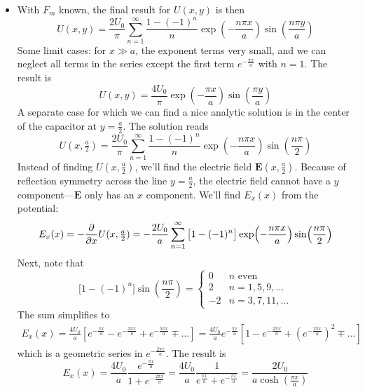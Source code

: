 \documentclass[11pt, a4paper]{article}
\renewcommand{\vec}[1]{\bm{#1}} %
\newcommand{\E}{\vec{E}} %
\begin{document}
\begin{itemize}
	\item With $ F_{m} $ known, the final result for $ U(x, y) $ is then
	\begin{equation*}
		U(x, y) = \frac{2U_{0}}{\pi} \sum_{n = 1}^{\infty}\frac{1 - (-1)^{n}}{n}\exp(-\frac{n\pi x}{a}) \sin(\frac{n\pi y}{a})
	\end{equation*}
	Some limit cases: for $ x \gg a $, the exponent terms very small, and we can neglect all terms in the series except the first term $ e^{-\frac{\pi x}{a}} $ with $ n = 1 $. The result is
	\begin{equation*}
		U(x, y) = \frac{4U_{0}}{\pi}\exp(-\frac{\pi x}{a}) \sin (\frac{\pi y}{a})
	\end{equation*}
	A separate case for which we can find a nice analytic solution is in the center of the capacitor at $ y = \frac{a}{2} $. The solution reads
	\begin{equation*}
		U(x, \tfrac{a}{2}) = \frac{2U_{0}}{\pi} \sum_{n = 1}^{\infty}\frac{1 - (-1)^{n}}{n}\exp(-\frac{n\pi x}{a}) \sin(\frac{n\pi}{2})
	\end{equation*}
	Instead of finding $ U(x, \tfrac{a}{2}) $, we'll find the electric field $ \E(x, \tfrac{a}{2}) $. Because of reflection symmetry across the line $ y = \frac{a}{2} $, the electric field cannot have a $ y $ component---$ \E $ only has an $ x $ component. We'll find $ E_{x}(x) $ from the potential:
	\begin{equation*}
		E_{x}(x) = -\pdv{}{x}U(x, \tfrac{a}{2}) = -\frac{2U_{0}}{a} \sum_{n = 1}^{\infty}\big[1 - (-1)^{n}\big]\exp(-\frac{n\pi x}{a}) \sin(\frac{n\pi}{2})
	\end{equation*}
	Next, note that
	\begin{equation*}
		\big[1 - (-1)^{n}\big]\sin(\frac{n\pi}{2}) = 
		\begin{cases}
			0 & n \text{ even}\\
			2 & n = 1, 5, 9, \ldots\\
			- 2 & n = 3, 7, 11, \ldots
		\end{cases}
	\end{equation*}
	The sum simplifies to
	\begin{align*}
		E_{x}(x) = \frac{4U_{0}}{a}\left[e^{-\frac{\pi x}{a}} - e^{-\frac{3\pi x}{a}} + e^{-\frac{5\pi x}{a}} \mp \ldots \right] = \frac{4U_{0}}{a}e^{-\frac{\pi x}{a}}\left[1 - e^{-\frac{2\pi x}{a}} + \left(e^{-\frac{2\pi x}{a}}\right)^{2}\mp \ldots \right]
	\end{align*}
	which is a geometric series in $ e^{-\frac{2\pi x}{a}} $. The result is
	\begin{equation*}
		E_{x}(x) =  \frac{4U_{0}}{a}\frac{e^{-\frac{\pi x}{a}}}{1 + e^{-\frac{2\pi x}{a}}} = \frac{4U_{0}}{a}\frac{1}{e^{\frac{\pi x}{a}} + e^{-\frac{\pi x}{a}}} = \frac{2U_{0}}{a\cosh(\frac{\pi x}{a})}
	\end{equation*}
\end{itemize}
\end{document}
